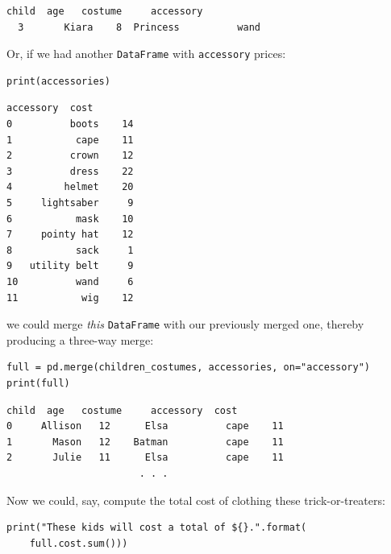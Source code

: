 \begin{Verbatim}[fontsize=\small,samepage=true,frame=leftline,framesep=5mm,framerule=1mm]
          child  age   costume     accessory
  3       Kiara    8  Princess          wand
\end{Verbatim}

\smallskip
Or, if we had another \texttt{DataFrame} with \texttt{accessory} prices:

\begin{Verbatim}[fontsize=\small,samepage=true,frame=single,framesep=3mm]
print(accessories)
\end{Verbatim}
\vspace{-.2in}

\begin{Verbatim}[fontsize=\small,samepage=true,frame=leftline,framesep=5mm,framerule=1mm]
       accessory  cost
0          boots    14
1           cape    11
2          crown    12
3          dress    22
4         helmet    20
5     lightsaber     9
6           mask    10
7     pointy hat    12
8           sack     1
9   utility belt     9
10          wand     6
11           wig    12
\end{Verbatim}


we could merge \textit{this} \texttt{DataFrame} with our previously merged one,
thereby producing a three-way merge:

\begin{Verbatim}[fontsize=\footnotesize,samepage=true,frame=single,framesep=3mm]
full = pd.merge(children_costumes, accessories, on="accessory")
print(full)
\end{Verbatim}
\vspace{-.2in}

\begin{Verbatim}[fontsize=\small,samepage=true,frame=leftline,framesep=5mm,framerule=1mm]
        child  age   costume     accessory  cost
0     Allison   12      Elsa          cape    11
1       Mason   12    Batman          cape    11
2       Julie   11      Elsa          cape    11
                       . . .
\end{Verbatim}

Now we could, say, compute the total cost of clothing these trick-or-treaters:

\begin{Verbatim}[fontsize=\small,samepage=true,frame=single,framesep=3mm]
print("These kids will cost a total of ${}.".format(
    full.cost.sum()))
\end{Verbatim}
\vspace{-.2in}

